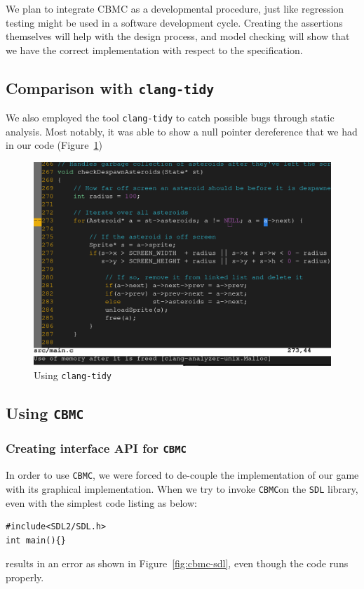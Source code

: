 \documentclass{article}
\newcommand{\cbmc}{\texttt{CBMC}}
\begin{document}
	We plan to integrate CBMC as a developmental procedure, just like regression testing might be used in a software development cycle.
	Creating the assertions themselves will help with the design process, and model checking will show that we have the correct implementation with respect to the specification.

\subsection{Comparison with \texttt{clang-tidy}}
We also employed the tool \texttt{clang-tidy} to catch possible bugs through static analysis.
Most notably, it was able to show a null pointer dereference that we had in our code (Figure~\ref{fig:clang-tidy})
\begin{figure}[h!]
    \includegraphics[width=\linewidth]{clang-tidy.png}
    \caption{Using \texttt{clang-tidy}}
    \label{fig:clang-tidy}
\end{figure}

\subsection{Using \cbmc}
\subsubsection{Creating interface API for \cbmc}
In order to use \cbmc, we were forced to de-couple the implementation of our game with its graphical implementation.
When we try to invoke \cbmc on the \texttt{SDL} library, even with the simplest code listing as below:
\begin{verbatim}
#include<SDL2/SDL.h>
int main(){}
\end{verbatim}
results in an error as shown in Figure~\ref{fig:cbmc-sdl}, even though the code runs properly.
\end{document}
